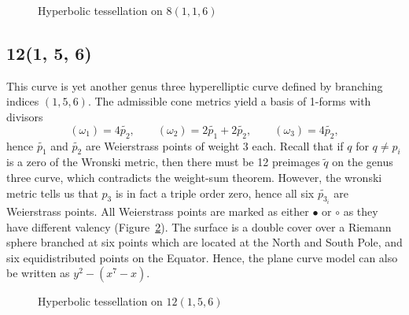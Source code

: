 \documentclass[12pt,reqno]{amsart}
\theoremstyle{definition}
\theoremstyle{remark}
\begin{document}
\begin{figure}[htbp]
    \centering
    \caption{Hyperbolic tessellation on $8(1, 1, 6)$}%
    \label{fig:116}%
\end{figure}




\subsection*{12(1, 5, 6)}
This curve is yet another genus three hyperelliptic curve defined by branching indices $(1, 5, 6).$ The admissible cone metrics yield a basis of 1-forms with divisors $$(\omega_1) = 4 \widetilde{p_2}, \qquad (\omega_2) = 2 \widetilde{p_1} + 2 \widetilde{p_2}, \qquad (\omega_3) = 4 \widetilde{p_2},$$ hence $\widetilde{p_1}$ and $\widetilde{p_2}$ are Weierstrass points of weight 3 each. Recall that if $q$ for $q \neq p_i$ is a zero of the Wronski metric, then there must be 12 preimages $\widetilde{q}$ on the genus three curve, which contradicts the weight-sum theorem. However, the wronski metric tells us that $p_3$ is in fact a triple order zero, hence all six $\widetilde{p_{3_i}}$ are Weierstrass points. All Weierstrass points are marked as either $\bullet$ or $\circ$ as they have different valency (Figure~\ref{fig:156}). The surface is a double cover over a Riemann sphere branched at six points which are located at the North and South Pole, and six equidistributed points on the Equator. Hence, the plane curve model can also be written as $y^2 - (x^7 - x).$

\begin{figure}[htbp]
    \centering
    \caption{Hyperbolic tessellation on $12(1, 5, 6)$}%
    \label{fig:156}%
\end{figure}
\end{document}
